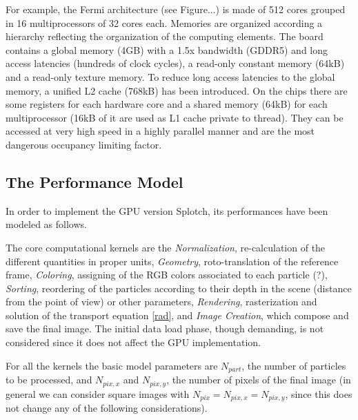 \documentclass[11pt]{article}
\begin{document}
For example, the Fermi architecture (see Figure...) is made of 512 cores grouped in 16 multiprocessors of 32 cores each. Memories are organized according a hierarchy reflecting the organization of the computing elements. The board contains a global memory (4GB) with a 1.5x bandwidth (GDDR5) and long access latencies (hundreds of clock cycles), a read-only constant memory (64kB) and a read-only texture memory. To reduce long access latencies to the global memory, a unified L2 cache (768kB) has been introduced. On the chips there are some registers for each hardware core and a shared memory (64kB) for each multiprocessor (16kB of it are used as L1 cache private to thread). They can be accessed at very high speed in a highly parallel manner and are the most dangerous occupancy limiting factor.
 

\subsection{The Performance Model}

In order to implement the GPU version Splotch, its performances have been modeled
as follows.

The core computational kernels are the {\it Normalization}, re-calculation
of the different quantities in proper units, {\it Geometry}, roto-translation 
of the reference frame, {\it Coloring}, assigning of the RGB colors associated to each 
particle (?), {\it Sorting}, reordering of the particles according to their depth in 
the scene (distance from the point of view) or other parameters, {\it Rendering},
rasterization and solution of the transport equation \eqref{rad}, 
and {\it Image Creation}, which compose
and save the final image. The initial data load phase, though demanding, is not considered
since it does not affect the GPU implementation.

For all the kernels the basic model parameters are $N_{part}$, the number of particles
to be processed, and $N_{pix,x}$ and $N_{pix,y}$, the number of pixels of the final image
(in general we can consider square images with $N_{pix}=N_{pix,x}=N_{pix,y}$, since this
does not change any of the following considerations). 
\end{document}
